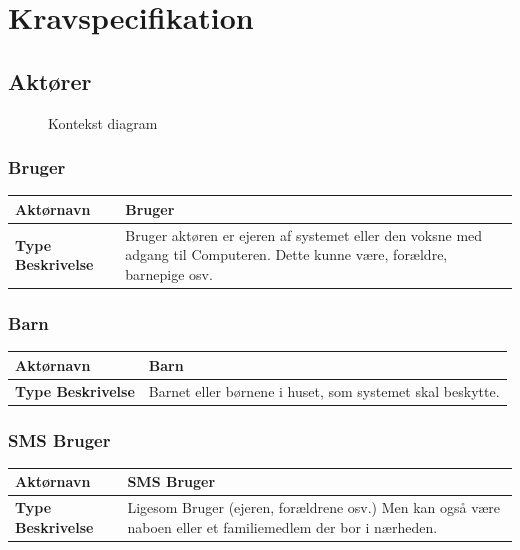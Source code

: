 \chapter{Kravspecifikation}

\section{Aktører}

\begin{figure}[h] \centering
{}
\caption{Kontekst diagram}
\label{lab:kontekstdiagram}
\end{figure}

\subsection{Bruger}
\begin{table}[htbp] \centering
\begin{tabular}{|p{4cm}|p{7cm}|}
	\hline
\textbf{Aktørnavn} &Bruger \\\hline
\textbf{Type Beskrivelse} &
Bruger aktøren er ejeren af systemet eller den voksne med adgang til Computeren.
Dette kunne være, forældre, barnepige osv.	
\\\hline
	\end{tabular}
\end{table}

\subsection{Barn}
\begin{table}[htbp] \centering
\begin{tabular}{|p{4cm}|p{7cm}|}
	\hline
\textbf{Aktørnavn} &Barn \\\hline
\textbf{Type Beskrivelse} &
Barnet eller børnene i huset, som systemet skal beskytte.	
\\\hline
	\end{tabular}
\end{table}

\subsection{SMS Bruger}
\begin{table}[htbp] \centering
\begin{tabular}{|p{4cm}|p{7cm}|}
	\hline
\textbf{Aktørnavn} &SMS Bruger \\\hline
\textbf{Type Beskrivelse} &
Ligesom Bruger (ejeren, forældrene osv.)
Men kan også være naboen eller et familiemedlem der bor i nærheden.
\\\hline
	\end{tabular}
\end{table}

